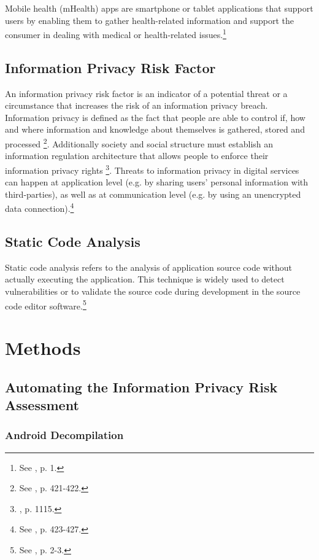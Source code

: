 \documentclass[
	a4paper,
	oneside,
	12pt,
	liststotocnumbered
]{article}
\let\cite\textcite
\begin{document}
Mobile health (\acs{mHealth}) apps are smartphone or tablet applications that support users by enabling them to gather health-related information and support the consumer in dealing with medical or health-related issues.\footnote{See \cite{Dehling2015b}, p. 1.}

\subsection{Information Privacy Risk Factor}
An information privacy risk factor is an indicator of a potential threat or a circumstance that increases the risk of an information privacy breach.
Information privacy is defined as the fact that people are able to control if, how and where information and knowledge about themselves is gathered, stored and processed \footnote{See \cite{Fischer1998}, p. 421-422.}.
Additionally society and social structure must establish an information regulation architecture that allows people to enforce their information privacy rights \footnote{\cite{Solove2002}, p. 1115.}.
Threats to information privacy in digital services can happen at application level (e.g. by sharing users' personal information with third-parties), as well as at communication level (e.g. by using an unencrypted data connection).\footnote{See \cite{Fischer1998}, p. 423-427.}
\subsection{Static Code Analysis}

Static code analysis refers to the analysis of application source code without actually executing the application. 
This technique is widely used to detect vulnerabilities or to validate the source code during development in the source code editor software.\footnote{See \cite{Bardas2010}, p. 2-3.}

\section{Methods}

\subsection{Automating the Information Privacy Risk Assessment}

\subsubsection{Android Decompilation}
\end{document}
